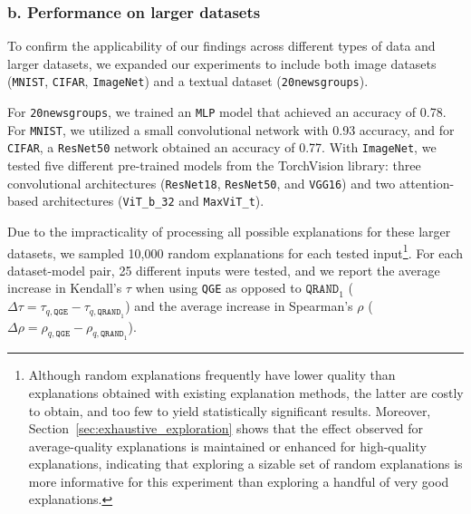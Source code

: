 \subsubsection{b. Performance on larger datasets}\label{sec:large_dataset_exploration}
To confirm the applicability of our findings across different types of data and larger datasets, we expanded our experiments to include both image datasets (\texttt{MNIST}, \texttt{CIFAR}, \texttt{ImageNet}) and a textual dataset (\texttt{20newsgroups}).%


For \texttt{20newsgroups}, we trained an \texttt{MLP} model that achieved an accuracy of 0.78. For \texttt{MNIST}, we utilized a small convolutional network with 0.93 accuracy, and for \texttt{CIFAR}, a \texttt{ResNet50} network obtained an accuracy of 0.77. With \texttt{ImageNet}, we tested five different pre-trained models from the TorchVision library: three convolutional architectures (\texttt{ResNet18}, \texttt{ResNet50}, and \texttt{VGG16}) and two attention-based architectures (\texttt{ViT\_b\_32} and \texttt{MaxViT\_t}).

Due to the impracticality of processing all possible explanations for these larger datasets, we sampled 10,000 random explanations for each tested input\footnote{Although random explanations frequently have lower quality than explanations obtained with existing explanation methods, the latter are costly to obtain, and too few to yield statistically significant results. Moreover, Section~\ref{sec:exhaustive_exploration} shows that the effect observed for average-quality explanations is maintained or enhanced for high-quality explanations, indicating that exploring a sizable set of random explanations is more informative for this experiment than exploring a handful of very good explanations.}. For each dataset-model pair, 25 different inputs were tested, and we report the average increase in Kendall's $\tau$ when using \texttt{QGE} as opposed to $\texttt{QRAND}_1$ ($\Delta \tau=\tau_{q,\texttt{QGE}}-\tau_{q,\texttt{QRAND}_1}$) and the average 
 increase in Spearman's $\rho$ ($\Delta\rho=\rho_{q,\texttt{QGE}}-\rho_{q,\texttt{QRAND}_1}$).

